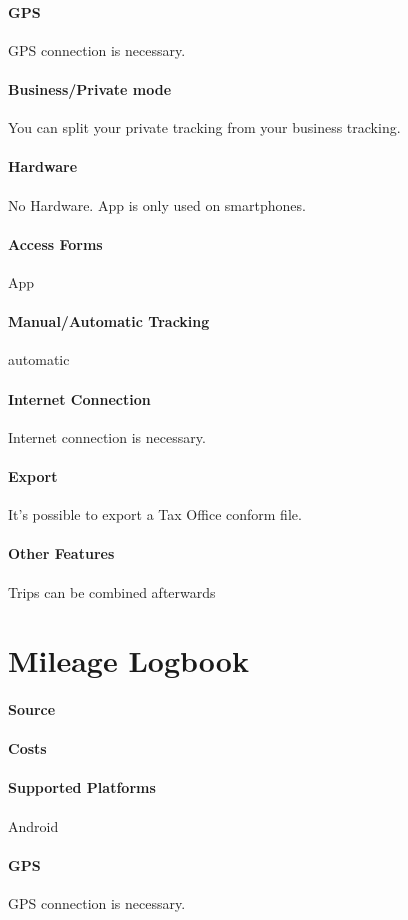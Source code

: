 \paragraph{GPS} GPS connection is necessary.
\paragraph{Business/Private mode} You can split your private tracking from your business tracking.
\paragraph{Hardware} No Hardware. App is only used on smartphones.
\paragraph{Access Forms} App
\paragraph{Manual/Automatic Tracking} automatic
\paragraph{Internet Connection} Internet connection is necessary.
\paragraph{Export} It’s possible to export a Tax Office conform file.
\paragraph{Other Features}Trips can be combined afterwards
\newpage
\section{Mileage Logbook}
\paragraph{Source} 
\paragraph{Costs} 
\paragraph{Supported Platforms} Android 
\paragraph{GPS} GPS connection is necessary.
